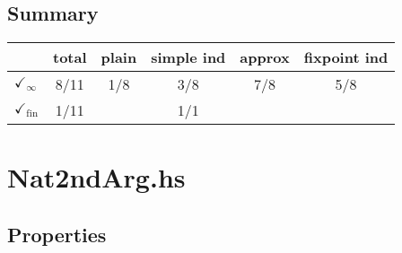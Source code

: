 \documentclass{article}
\begin{document}
\subsection*{Summary}
\begin{longtable}{p{4cm} || c | c | c | c | c | }
  & total & plain & simple ind & approx & fixpoint ind \\
\hline
$\checkmark_{\infty}$ & 8/11 & 1/8 & 3/8 & 7/8 & 5/8\\
\hline
$\checkmark_{\mathrm{fin}}$ & 1/11 &  & 1/1 &  & \\
\end{longtable}

\section*{Nat2ndArg.hs}
\subsection*{Properties}
\end{document}
